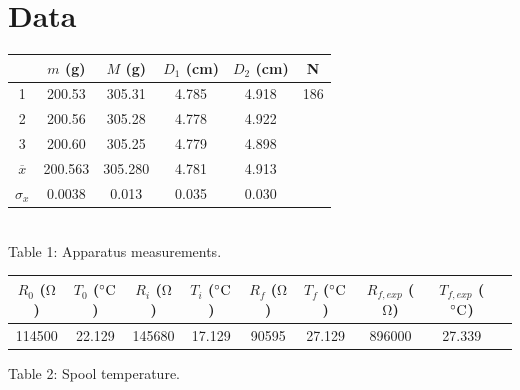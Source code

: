 \documentclass[12pt]{article}
\newcommand{\cel}{\degree \mathrm{C}}
\begin{document}
    \section{Data}
        \begin{center}
            \begin{tabular}{c|c|c|c|c|c}
                & \(m\) (g) & \(M\) (g) & \(D_1\) (cm) & \(D_2\) (cm) & N\\
                \hline
                1 & 200.53 & 305.31 & 4.785 & 4.918 & 186\\
                2 & 200.56 & 305.28 & 4.778 & 4.922 & \\
                3 & 200.60 & 305.25 & 4.779 & 4.898 & \\
                \hline
                \(\overline{x}\) & 200.563 & 305.280 & 4.781 & 4.913\\
                \(\sigma_x\) & 0.0038 & 0.013 & 0.035 & 0.030
            \end{tabular}\\[6pt]
            Table 1: Apparatus measurements.\\[12pt]
        \end{center}
        \begin{center}
            \begin{tabular}{c|c|c|c|c|c|c|c|c}
                \(R_0\) (\(\mathrm{\Omega}\))  & \(T_0\) (\(\cel\)) & \(R_i\) (\(\mathrm{\Omega}\))  & \(T_i\) (\(\cel\)) & \(R_f\) (\(\mathrm{\Omega}\))  & \(T_f\) (\(\cel\)) & \(R_{f,exp}\) (\(\mathrm{\Omega}\))  & \(T_{f,exp}\) (\(\cel\))\\
                \hline
                114500 & 22.129 & 145680 & 17.129 & 90595 & 27.129 & 896000 & 27.339
            \end{tabular}
            Table 2: Spool temperature.\\
        \end{center}
\end{document}
